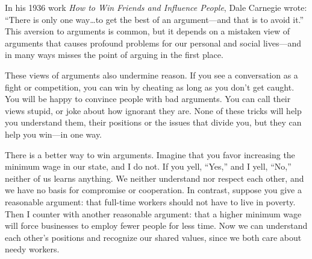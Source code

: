 \begin{listmatch}
\item 
 In his 1936 work \emph{How to Win Friends and Influence People}, Dale
Carnegie wrote: ``There is only one way\ldots to get the best of an
argument---and that is to avoid it.'' This aversion to arguments is
common, but it depends on a mistaken view of arguments that causes
profound problems for our personal and social lives---and in many ways
misses the point of arguing in the first place.


\item 
These views of arguments also undermine reason. If you see a
conversation as a fight or competition, you can win by cheating as long
as you don't get caught. You will be happy to convince people with bad
arguments. You can call their views stupid, or joke about how ignorant
they are. None of these tricks will help you understand them, their
positions or the issues that divide you, but they can help you win---in
one way.


\item 
There is a better way to win arguments. Imagine that you favor
increasing the minimum wage in our state, and I do not. If you yell,
``Yes,'' and I yell, ``No,'' neither of us learns anything. We neither
understand nor respect each other, and we have no basis for compromise
or cooperation. In contrast, suppose you give a reasonable argument:
that full-time workers should not have to live in poverty. Then I
counter with another reasonable argument: that a higher minimum wage
will force businesses to employ fewer people for less time. Now we can
understand each other's positions and recognize our shared values, since
we both care about needy workers.

\end{listmatch}




